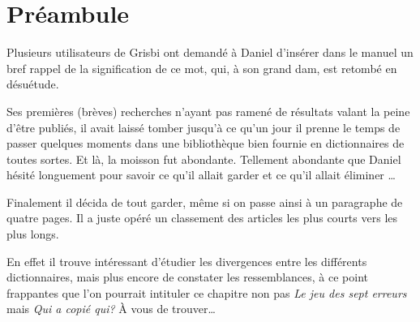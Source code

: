 

\chapter{Préambule\label{preamble}}


Plusieurs utilisateurs de \gls{Grisbi} ont demandé à Daniel  d'insérer dans le manuel un bref rappel de la signification de ce mot, qui, à son grand dam, est retombé en désuétude.

Ses premières (brèves) recherches n'ayant pas ramené de résultats valant la peine d'être publiés, il avait laissé tomber jusqu'à ce qu'un jour il prenne le temps de passer quelques moments dans une bibliothèque bien fournie en dictionnaires de toutes sortes. Et là, la moisson fut abondante. Tellement abondante que Daniel  hésité longuement pour savoir ce qu'il allait garder et ce qu'il allait éliminer  \ldots 

Finalement il décida de tout garder, même si on passe ainsi à un paragraphe de quatre pages. Il a juste opéré un classement des articles les plus courts vers les plus longs.

En effet il trouve intéressant d'étudier les divergences entre les différents dictionnaires, mais plus encore de constater les ressemblances, à ce point frappantes que l'on pourrait intituler ce chapitre non pas \emph{Le jeu des sept erreurs} mais \emph{Qui a copié qui?} À vous de trouver\dots

